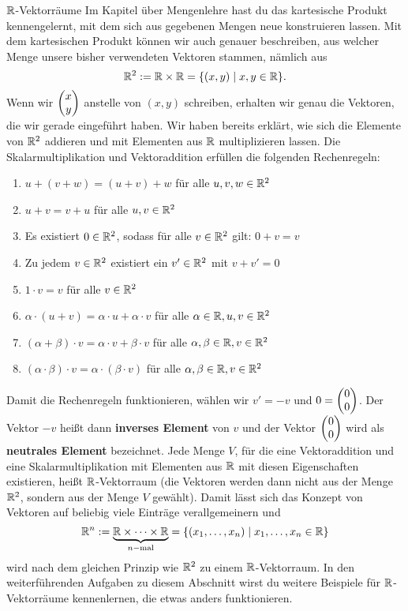 \documentclass[../../main.tex]{subfiles}
\begin{document}
\begin{advanced}{$\mathbb{R}$-Vektorräume}
    Im Kapitel über Mengenlehre hast du das kartesische Produkt kennengelernt, mit dem sich aus gegebenen Mengen neue
    konstruieren lassen. Mit dem kartesischen Produkt können wir auch genauer beschreiben, aus welcher Menge unsere
    bisher verwendeten Vektoren stammen, nämlich aus
    \[\mathbb{R}^2:=\mathbb{R}\times\mathbb{R}=\{(x,y)\mid x,y\in\mathbb{R}\}.\]
    Wenn wir $\begin{pmatrix} x\\ y \end{pmatrix}$ anstelle von $(x,y)$ schreiben, erhalten wir genau die Vektoren, die wir gerade eingeführt 
    haben. Wir haben bereits erklärt, wie sich die Elemente von $\mathbb{R}^2$ addieren und mit Elementen aus $\mathbb{R}$ multiplizieren
    lassen. Die Skalarmultiplikation und Vektoraddition erfüllen die folgenden Rechenregeln:

    \begin{multicols}{2}
        \begin{enumerate}
        \item $u+(v+w)=(u+v)+w$ für alle $u,v,w\in\mathbb{R}^2$
        \item $u+v=v+u$ für alle $u,v\in\mathbb{R}^2$
        \item Es existiert $0\in\mathbb{R}^2$, sodass für alle $v\in\mathbb{R}^2$ gilt: $0+v=v$
        \item Zu jedem $v\in\mathbb{R}^2$ existiert ein $v'\in\mathbb{R}^2$ mit $v+v'=0$
        \item $1\cdot v=v$ für alle $v\in\mathbb{R}^2$
        \item $\alpha\cdot (u+v)=\alpha\cdot u+\alpha\cdot v$ für alle $\alpha\in\mathbb{R}, u,v\in\mathbb{R}^2$
        \item $(\alpha+\beta)\cdot v=\alpha\cdot v+\beta\cdot v$ für alle $\alpha,\beta\in\mathbb{R}, v\in\mathbb{R}^2$
        \item $(\alpha\cdot\beta)\cdot v=\alpha\cdot (\beta\cdot v)$ für alle $\alpha,\beta\in\mathbb{R},v\in\mathbb{R}^2$
        \end{enumerate}
    \end{multicols}
    Damit die Rechenregeln funktionieren, wählen wir $v'=-v$ und $0=\begin{pmatrix} 0\\ 0 \end{pmatrix}$. Der Vektor $-v$ heißt dann \textbf{inverses
    Element} von $v$ und der Vektor $\begin{pmatrix} 0\\ 0 \end{pmatrix}$ wird als \textbf{neutrales Element} bezeichnet.
    Jede Menge $V$, für die eine Vektoraddition und eine Skalarmultiplikation mit Elementen aus $\mathbb{R}$ mit diesen Eigenschaften
    existieren, heißt $\mathbb{R}$-Vektorraum (die Vektoren werden dann nicht aus der Menge $\mathbb{R}^2$, sondern aus der Menge $V$ 
    gewählt). Damit lässt sich das Konzept von Vektoren auf beliebig viele Einträge 
    verallgemeinern und
    \[\mathbb{R}^n:=\underbrace{\mathbb{R}\times\dots\times\mathbb{R}}_{n-\text{mal}}=\{(x_1,\dots,x_n)\mid x_1,\dots,x_n\in\mathbb{R}\}\]
    wird nach dem gleichen Prinzip wie $\mathbb{R}^2$ zu einem $\mathbb{R}$-Vektorraum. In den weiterführenden Aufgaben zu diesem 
    Abschnitt wirst du weitere Beispiele für $\mathbb{R}$-Vektorräume kennenlernen, die etwas anders funktionieren.
\end{advanced}
\end{document}
